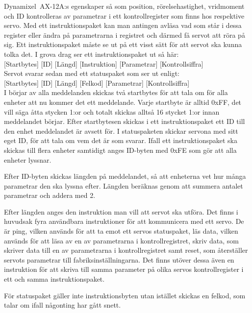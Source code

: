 \documentclass[a4paper,12pt]{article}
\begin{document}
Dynamixel~AX-12A:s egenskaper så som position, rörelsehastighet, vridmoment och ID kontrolleras av parametrar i ett kontrollregister som finns hos respektive servo. Med ett instruktionspaket kan man antingen avläsa vad som står i dessa register eller ändra på parametrarna i registret och därmed få servot att röra på sig. Ett instruktionspaket måste se ut på ett visst sätt för att servot ska kunna tolka det. I grova drag ser ett instruktionspaket ut så här:\\

[Startbytes] [ID] [Längd] [Instruktion] [Parametrar] [Kontrollsiffra]\\

Servot svarar sedan med ett statuspaket som ser ut enligt:\\

[Startbytes] [ID] [Längd] [Felkod] [Parametrar] [Kontrollsiffra]\\

I börjar av alla meddelanden skickas två startbytes för att tala om för alla enheter att nu kommer det ett meddelande. Varje startbyte är alltid 0xFF, det vill säga åtta stycken 1:or och totalt skickas alltså 16 stycket 1:or innan meddelandet börjar. Efter startbytesen skickas i ett instruktionspaket ett ID till den enhet meddelandet är avsett för. I statuspaketen skickar servona med sitt eget ID, för att tala om vem det är som svarar. Ifall ett instruktionspaket ska skickas till flera enheter samtidigt anges ID-byten med 0xFE som gör att alla enheter lyssnar. 

Efter ID-byten skickas längden på meddelandet, så att enheterna vet hur många parametrar den ska lyssna efter. Längden beräknas genom att summera antalet parametrar och addera med 2.

Efter längden anges den instruktion man vill att servot ska utföra. Det finns i huvudsak fyra användbara instruktioner för att kommunicera med ett servo. De är ping, vilken används för att ta emot ett servos statuspaket, läs data, vilken används för att läsa av en av parametrarna i kontrollregistret, skriv data, som skriver data till en av parametrarna i kontrollregistret samt reset, som återställer servots parametrar till fabriksinställningarna. Det finns utöver dessa även en instruktion för att skriva till samma parameter på olika servos kontrollregister i ett och samma instruktionspaket. 

För statuspaket gäller inte instruktionsbyten utan istället skickas en felkod, som talar om ifall någonting har gått snett.
\end{document}
